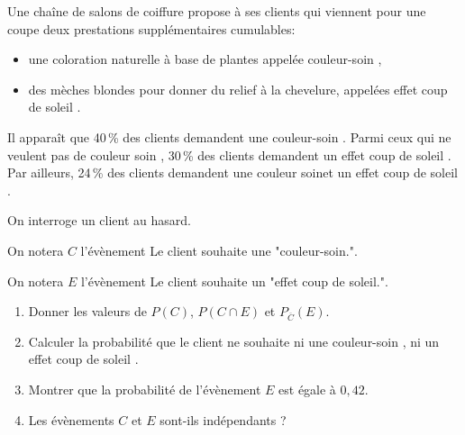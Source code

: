 \medskip

Une chaîne de salons de coiffure propose à ses clients qui viennent pour une coupe deux prestations supplémentaires cumulables:
\begin{itemize}
\item une coloration naturelle à base de plantes appelée \og couleur-soin \fg,
\item des mèches blondes pour donner du relief à la chevelure, appelées \og effet coup de soleil \fg.
\end{itemize}

\smallskip

Il apparaît que 40\,\% des clients demandent une \og couleur-soin \fg. Parmi ceux qui ne veulent pas de \og couleur soin \fg, 30\,\% des clients demandent un \og effet coup de soleil \fg. Par ailleurs, 24\,\% des clients demandent une \og couleur soin\fg et un \og effet coup de soleil \fg.

On interroge un client au hasard.

On notera $C$ l'évènement \og Le client souhaite une "couleur-soin."\fg.

On notera $E$ l'évènement \og Le client souhaite un "effet coup de soleil."\fg.

\medskip

\begin{enumerate}
\item Donner les valeurs de $P(C)$, $P( C \cap E)$ et $P_{\overline{C}}(E)$.
\item Calculer la probabilité que le client ne souhaite ni une \og couleur-soin \fg, ni un \og
effet coup de soleil \fg.
\item Montrer que la probabilité de l'évènement $E$ est égale à $0,42$.
\item Les évènements $C$ et $E$ sont-ils indépendants ?
\end{enumerate}

\bigskip
